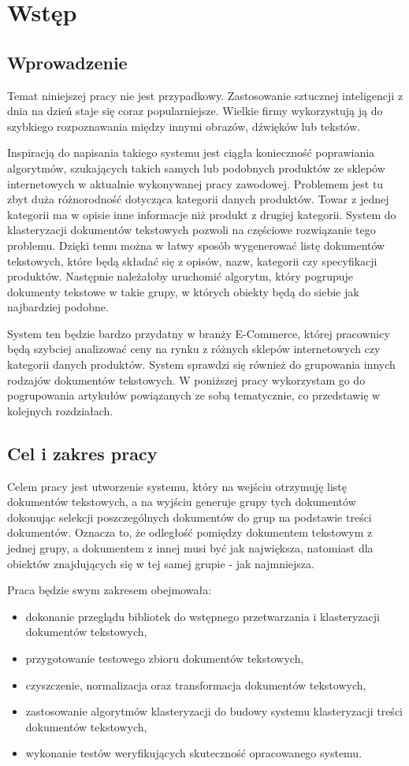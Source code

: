 \chapter{Wstęp}
\section{Wprowadzenie}
Temat niniejszej pracy nie jest przypadkowy. Zastosowanie sztucznej inteligencji z dnia na dzień staje się coraz popularniejsze. Wielkie firmy wykorzystują ją do szybkiego rozpoznawania między innymi obrazów, dźwięków lub tekstów.

Inspiracją do napisania takiego systemu jest ciągła konieczność poprawiania algorytmów, szukających takich samych lub podobnych produktów ze sklepów internetowych w aktualnie wykonywanej pracy zawodowej. Problemem jest tu zbyt duża różnorodność dotycząca kategorii danych produktów. Towar z jednej kategorii ma w opisie inne informacje niż produkt z drugiej kategorii. System do klasteryzacji dokumentów tekstowych pozwoli na częściowe rozwiązanie tego problemu. Dzięki temu można w łatwy sposób wygenerować listę dokumentów tekstowych, które będą składać się z opisów, nazw, kategorii czy specyfikacji produktów. Następnie należałoby uruchomić algorytm, który pogrupuje dokumenty tekstowe w takie grupy, w których obiekty będą do siebie jak najbardziej podobne.

System ten będzie bardzo przydatny w branży E-Commerce, której pracownicy będą szybciej analizować ceny na rynku z różnych sklepów internetowych czy kategorii danych produktów. System sprawdzi się również do grupowania innych rodzajów dokumentów tekstowych. W poniższej pracy wykorzystam go do pogrupowania artykułów powiązanych ze sobą tematycznie, co przedstawię w kolejnych rozdziałach.


\section{Cel i zakres pracy}
Celem pracy jest utworzenie systemu, który na wejściu otrzymuję listę dokumentów tekstowych, a na wyjściu generuje grupy tych dokumentów dokonując selekcji poszczególnych dokumentów do grup na podstawie treści dokumentów. Oznacza to, że odległość pomiędzy dokumentem tekstowym z jednej grupy, a dokumentem z innej musi być jak największa, natomiast dla obiektów znajdujących się w tej samej grupie - jak najmniejsza.

Praca będzie swym zakresem obejmowała:
\begin{itemize}
    \item dokonanie przeglądu bibliotek do wstępnego przetwarzania i klasteryzacji dokumentów tekstowych,
    \item przygotowanie testowego zbioru dokumentów tekstowych,
    \item czyszczenie, normalizacja oraz transformacja dokumentów tekstowych,
    \item zastosowanie algorytmów klasteryzacji do budowy systemu klasteryzacji treści dokumentów tekstowych,
    \item wykonanie testów weryfikujących skuteczność opracowanego systemu.
\end{itemize}

